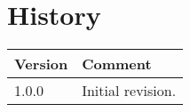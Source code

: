 \chapter{History}

\begin{tabular}{|p{}|p{}|}
\hline 
Version&
Comment\tabularnewline
\hline
\hline 
1.0.0&
Initial revision.\tabularnewline
\hline
\end{tabular}
